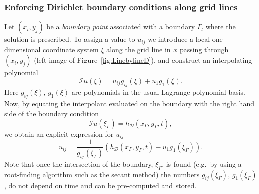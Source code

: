 \documentclass[11pt]{article}
\newcommand{\fig}[1]{\mbox{Figure{~#1}}}
\newcommand{\be}{\begin{equation}}
\newcommand{\ee}{\end{equation}}
\newcommand{\bd}{\begin{displaymath}}
\newcommand{\ed}{\end{displaymath}}
\begin{document}
\subsubsection{Enforcing Dirichlet boundary conditions along grid lines}\label{sec:linebyline}
Let $(x_i, y_j)$ be a \emph{boundary point} associated with a boundary $\Gamma_l$ where the solution is
prescribed. To assign a value to $u_{ij}$ we introduce a local one-dimensional coordinate system
$\xi$ along the grid line in $x$ passing through $(x_i,y_j)$ (left image of
\fig{\ref{fig:LinebylineD}}), and construct an interpolating polynomial 
%
\be \label{eq:Interpolant}
\mathcal{I}u(\xi) = u_{ij} g_{ij}(\xi) + u_{1} g_{1}(\xi).  
\ee 
%
Here $g_{ij}(\xi),\, g_1(\xi)$ are  polynomials in the usual Lagrange polynomial basis. Now, by equating the
interpolant evaluated on the boundary with the right hand side of the boundary condition 
%
\bd \mathcal{I}u(\xi_{\Gamma}) =
h_{\mathcal{D}}(x_\Gamma,y_{\Gamma},t), 
\ed
%
we obtain an explicit expression for $u_{ij}$ 
%
\be
\label{eq:DirichletLineByLine} u_{ij} = \frac{1}{g_{ij}(\xi_\Gamma)}
\left(h_{\mathcal{D}}(x_\Gamma,y_{\Gamma},t) -  u_{1}
g_{1}(\xi_\Gamma)\right).
\ee 
%
Note that once the intersection of the boundary, $\xi_\Gamma$, is found (e.g.~by using a
root-finding algorithm such as the secant method) the numbers $g_{ij}(\xi_\Gamma)$,
$g_{1}(\xi_\Gamma)$,  do not depend on time and can be pre-computed and
stored. 
\end{document}
